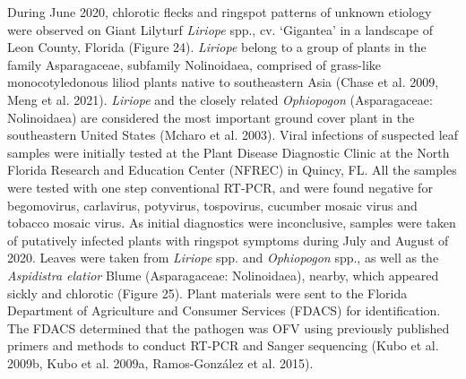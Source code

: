 \documentclass[12pt,final,CPage]{ufthesis}
\begin{document}
{  During June 2020, chlorotic flecks and ringspot patterns of unknown etiology were observed on Giant Lilyturf \emph{Liriope} spp., cv. `Gigantea' in a landscape of Leon County, Florida (Figure 24). \emph{Liriope} belong to a group of plants in the family Asparagaceae, subfamily Nolinoidaea, comprised of grass-like monocotyledonous liliod plants native to southeastern Asia (Chase et al. 2009, Meng et al. 2021). \emph{Liriope} and the closely related \emph{Ophiopogon} (Asparagaceae: Nolinoidaea) are considered the most important ground cover plant in the southeastern United States (Mcharo et al. 2003). Viral infections of suspected leaf samples were initially tested at the Plant Disease Diagnostic Clinic at the North Florida Research and Education Center (NFREC) in Quincy, FL. All the samples were tested with one step conventional RT-PCR, and were found negative for begomovirus, carlavirus, potyvirus, tospovirus, cucumber mosaic virus and tobacco mosaic virus. As initial diagnostics were inconclusive, samples were taken of putatively infected plants with ringspot symptoms during July and August of 2020. Leaves were taken from \emph{Liriope} spp. and \emph{Ophiopogon} spp., as well as the \emph{Aspidistra elatior} Blume (Asparagaceae: Nolinoidaea), nearby, which appeared sickly and chlorotic (Figure 25). Plant materials were sent to the Florida Department of Agriculture and Consumer Services (FDACS) for identification. The FDACS determined that the pathogen was OFV using previously published primers and methods to conduct RT-PCR and Sanger sequencing (Kubo et al. 2009b, Kubo et al. 2009a, Ramos-González et al. 2015).
}
\end{document}
